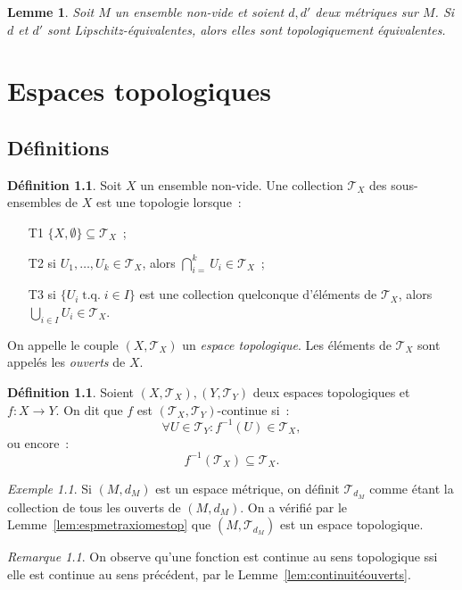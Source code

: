 \documentclass{report}
\newtheorem{lem}[thm]{Lemme}
\theoremstyle{definition}
\newtheorem{déf}[thm]{Définition}
\theoremstyle{remark}
\newtheorem*{rmq}{Remarque}
\newtheorem{ex}{Exemple}[chapter]
\DeclareMathOperator{\tq}{\text{ t.q. }}
\renewcommand{\top}{\mathcal T}
\begin{document}
		\begin{lem} Soit $M$ un ensemble non-vide et soient $d, d'$ deux métriques sur $M$. Si $d$ et $d'$ sont Lipschitz-équivalentes, alors elles sont topologiquement
		équivalentes.
		\end{lem}

\chapter{Espaces topologiques}
	\section{Définitions}
		\begin{déf} Soit $X$ un ensemble non-vide. Une collection $\top_X$ des sous-ensembles de $X$ est une topologie lorsque~:
		\begin{itemize}
			\item[T1] $\{X, \emptyset\} \subseteq \top_X$~;
			\item[T2] si $U_1, \ldots, U_k \in \top_X$, alors $\bigcap_{i=}^kU_i \in \top_X$~;
			\item[T3] si $\{U_i \tq i \in I\}$ est une collection quelconque d'éléments de $\top_X$, alors $\bigcup_{i \in I}U_i \in \top_X$.
		\end{itemize}

		On appelle le couple $(X, \top_X)$ un \textit{espace topologique}. Les éléments de $\top_X$ sont appelés les \textit{ouverts} de $X$.
		\end{déf}

		\begin{déf} Soient $(X, \top_X), (Y, \top_Y)$ deux espaces topologiques et $f : X \to Y$. On dit que $f$ est $(\top_X, \top_Y)$-continue si~:
		\[\forall U \in \top_Y : f^{-1}(U) \in \top_X,\]
		ou encore~:
		\[f^{-1}(\top_X) \subseteq \top_X.\]
		\end{déf}

		\begin{ex} Si $(M, d_M)$ est un espace métrique, on définit $\top_{d_M}$ comme étant la collection de tous les ouverts de $(M, d_M)$. On a vérifié par
		le Lemme~\ref{lem:espmetraxiomestop} que $(M, \top_{d_M})$ est un espace topologique.
		\end{ex}

		\begin{rmq} On observe qu'une fonction est continue au sens topologique ssi elle est continue au sens précédent, par le Lemme~\ref{lem:continuitéouverts}.
		\end{rmq}
\end{document}
